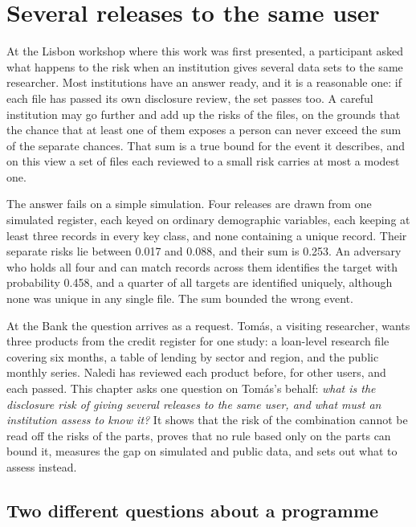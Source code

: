 \chapter{Several releases to the same user}\label{ch:programmes}

At the Lisbon workshop where this work was first presented, a participant asked what
happens to the risk when an institution gives several data sets to the same researcher. Most
institutions have an answer ready, and it is a reasonable one: if each file has passed its own
disclosure review, the set passes too. A careful institution may go further and add up the
risks of the files, on the grounds that the chance that at least one of them exposes a person
can never exceed the sum of the separate chances. That sum is a true bound for the event it
describes, and on this view a set of files each reviewed to a small risk carries at most a
modest one.

The answer fails on a simple simulation. Four releases are drawn from one simulated register,
each keyed on ordinary demographic variables, each keeping at least three records in every key
class, and none containing a unique record. Their separate risks lie between 0.017 and 0.088,
and their sum is 0.253. An adversary who holds all four and can match records across them
identifies the target with probability 0.458, and a quarter of all targets are identified
uniquely, although none was unique in any single file.
The sum bounded the wrong event.

At the Bank the question arrives as a request. Tomás, a visiting researcher, wants three
products from the credit register for one study: a loan-level research file covering six
months, a table of lending by sector and region, and the public monthly series. Naledi has
reviewed each product before, for other users, and each passed. This chapter asks one question
on Tomás's behalf: \emph{what is the disclosure risk of giving several releases to the same
user, and what must an institution assess to know it?} It shows that the risk of the
combination cannot be read off the risks of the parts, proves that no rule based only on the
parts can bound it, measures the gap on simulated and public data, and sets out what to assess
instead.

\section{Two different questions about a programme}


